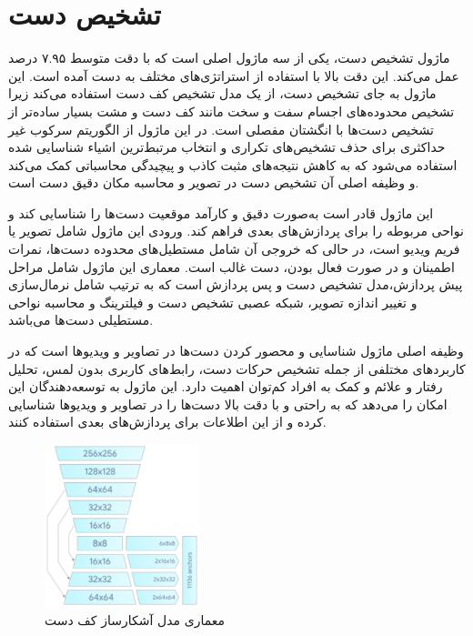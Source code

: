 


\section{تشخیص دست\protect{}}
ماژول تشخیص دست، یکی از سه ماژول اصلی است که با دقت متوسط ۷.۹۵ درصد عمل می‌کند. این دقت بالا با استفاده از استراتژی‌های مختلف به دست آمده است. این ماژول به جای تشخیص دست، 
از یک مدل تشخیص کف دست استفاده می‌کند زیرا تشخیص محدوده‌های اجسام سفت و سخت مانند کف دست و مشت بسیار ساده‌تر از تشخیص دست‌ها با انگشتان مفصلی است. در این ماژول از
 الگوریتم سرکوب غیر حداکثری برای حذف تشخیص‌های تکراری و انتخاب مرتبط‌ترین اشیاء شناسایی شده استفاده می‌شود که به کاهش نتیجه‌های مثبت کاذب و پیچیدگی محاسباتی کمک می‌کند و وظیفه اصلی آن تشخیص دست در تصویر و محاسبه مکان دقیق دست است.

این ماژول قادر است به‌صورت دقیق و کارآمد موقعیت دست‌ها را شناسایی کند و نواحی مربوطه را برای
 پردازش‌های بعدی فراهم کند. ورودی این ماژول شامل تصویر یا فریم ویدیو است، در حالی که خروجی آن شامل مستطیل‌های محدوده دست‌ها، نمرات اطمینان و در صورت فعال بودن، دست غالب است. معماری این ماژول شامل 
 مراحل پیش پردازش،مدل تشخیص دست و پس پردازش است که به ترتیب شامل نرمال‌سازی و تغییر اندازه تصویر، شبکه عصبی تشخیص دست و فیلترینگ و محاسبه نواحی مستطیلی دست‌ها می‌باشد.

وظیفه اصلی ماژول شناسایی و محصور کردن دست‌ها در تصاویر و ویدیوها است که در کاربردهای مختلفی از جمله تشخیص حرکات دست، رابط‌های کاربری بدون لمس، تحلیل رفتار و علائم و کمک به افراد کم‌توان
 اهمیت دارد. این ماژول به توسعه‌دهندگان این امکان را می‌دهد که به راحتی و با دقت بالا دست‌ها را در تصاویر و ویدیوها شناسایی کرده و از این اطلاعات برای پردازش‌های بعدی استفاده کنند.


\begin{figure}[h]
    \centering
    \includegraphics[width=0.4\textwidth]{hand_detector.png}
    \caption[معماری مدل آشکارساز کف دست]{معماری مدل آشکارساز کف دست\cite{zhang2020mediapipe}}
\end{figure}

